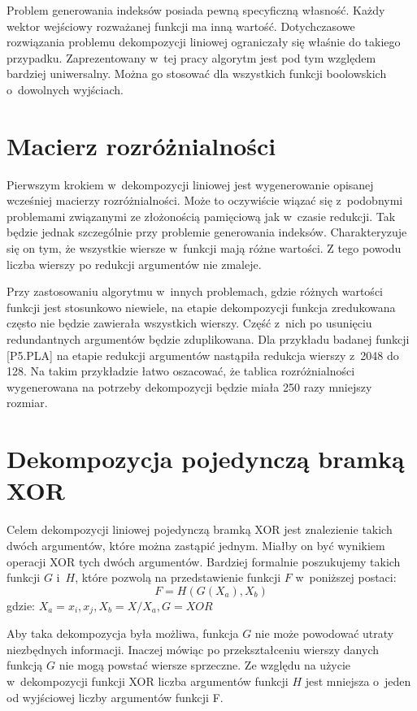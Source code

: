 Problem generowania indeksów posiada pewną specyficzną własność.
Każdy wektor wejściowy rozważanej funkcji ma inną wartość.
Dotychczasowe rozwiązania problemu dekompozycji liniowej ograniczały się właśnie do takiego przypadku.
Zaprezentowany w~tej pracy algorytm jest pod tym względem bardziej uniwersalny.
Można go stosować dla wszystkich funkcji boolowskich o~dowolnych wyjściach.

\section{Macierz rozróżnialności}

Pierwszym krokiem w~dekompozycji liniowej jest wygenerowanie opisanej wcześniej macierzy rozróżnialności.
Może to oczywiście wiązać się z~podobnymi problemami związanymi ze złożonością pamięciową jak w~czasie redukcji.
Tak będzie jednak szczególnie przy problemie generowania indeksów.
Charakteryzuje się on tym,
że wszystkie wiersze w~funkcji mają różne wartości.
Z tego powodu liczba wierszy po redukcji argumentów nie zmaleje.

Przy zastosowaniu algorytmu w~innych problemach,
gdzie różnych wartości funkcji jest stosunkowo niewiele,
na etapie dekompozycji funkcja zredukowana często nie będzie zawierała wszystkich wierszy.
Część z~nich po usunięciu redundantnych argumentów będzie zduplikowana.
Dla przykładu badanej funkcji [P5.PLA] na etapie redukcji argumentów nastąpiła redukcja wierszy z~2048 do 128.
Na takim przykładzie łatwo oszacować,
że tablica rozróżnialności wygenerowana na potrzeby dekompozycji będzie miała 250 razy mniejszy rozmiar.

\section{Dekompozycja pojedynczą bramką XOR}
\label{section:single-decomposition}
Celem dekompozycji liniowej pojedynczą bramką XOR jest znalezienie takich dwóch argumentów,
które można zastąpić jednym.
Miałby on być wynikiem operacji XOR tych dwóch argumentów.
Bardziej formalnie poszukujemy takich funkcji $G$ i~$H$,
które pozwolą na przedstawienie funkcji $F$ w~poniższej postaci:
\begin{equation}
F = H( G ( X_a ), X_b)
\end{equation}
gdzie: $X_a = {x_i, x_j}, X_b = X / X_a, G = XOR$

Aby taka dekompozycja była możliwa,
funkcja $G$ nie może powodować utraty niezbędnych informacji.
Inaczej mówiąc po przekształceniu wierszy danych funkcją $G$ nie mogą powstać wiersze sprzeczne.
Ze względu na użycie w~dekompozycji funkcji XOR liczba argumentów funkcji $H$ jest mniejsza o~jeden od wyjściowej liczby argumentów funkcji F.

